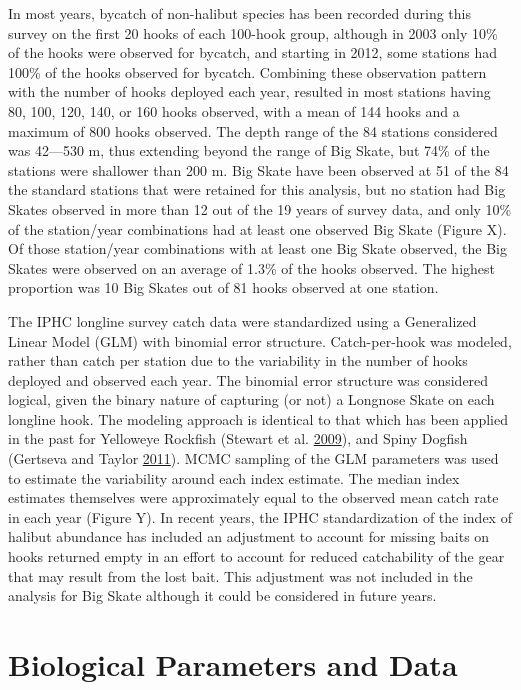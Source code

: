\documentclass[12pt,]{article}
\begin{document}
In most years, bycatch of non-halibut species has been recorded during
this survey on the first 20 hooks of each 100-hook group, although in
2003 only 10\% of the hooks were observed for bycatch, and starting in
2012, some stations had 100\% of the hooks observed for bycatch.
Combining these observation pattern with the number of hooks deployed
each year, resulted in most stations having 80, 100, 120, 140, or 160
hooks observed, with a mean of 144 hooks and a maximum of 800 hooks
observed. The depth range of the 84 stations considered was 42---530 m,
thus extending beyond the range of Big Skate, but 74\% of the stations
were shallower than 200 m. Big Skate have been observed at 51 of the 84
the standard stations that were retained for this analysis, but no
station had Big Skates observed in more than 12 out of the 19 years of
survey data, and only 10\% of the station/year combinations had at least
one observed Big Skate (Figure X). Of those station/year combinations
with at least one Big Skate observed, the Big Skates were observed on an
average of 1.3\% of the hooks observed. The highest proportion was 10
Big Skates out of 81 hooks observed at one station.

The IPHC longline survey catch data were standardized using a
Generalized Linear Model (GLM) with binomial error structure.
Catch-per-hook was modeled, rather than catch per station due to the
variability in the number of hooks deployed and observed each year. The
binomial error structure was considered logical, given the binary nature
of capturing (or not) a Longnose Skate on each longline hook. The
modeling approach is identical to that which has been applied in the
past for Yelloweye Rockfish (Stewart et al.
\protect\hyperlink{ref-Stewart2009}{2009}), and Spiny Dogfish (Gertseva
and Taylor \protect\hyperlink{ref-Gertseva2011}{2011}). MCMC sampling of
the GLM parameters was used to estimate the variability around each
index estimate. The median index estimates themselves were approximately
equal to the observed mean catch rate in each year (Figure Y). In recent
years, the IPHC standardization of the index of halibut abundance has
included an adjustment to account for missing baits on hooks returned
empty in an effort to account for reduced catchability of the gear that
may result from the lost bait. This adjustment was not included in the
analysis for Big Skate although it could be considered in future years.
\newpage

\hypertarget{biological-parameters-and-data}{%
\section{Biological Parameters and
Data}\label{biological-parameters-and-data}}
\end{document}
